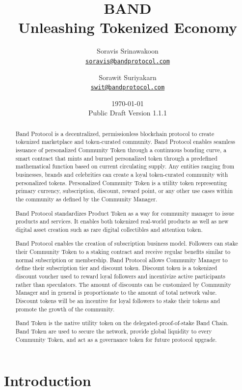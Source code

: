\documentclass[letterpaper,11pt]{article}
\title{\LARGE BAND\\
    \Large Unleashing Tokenized Economy}
\author{
        Soravis Srinawakoon\\
        \small\href{mailto:soravis@bandprotocol.com}
            {\nolinkurl{soravis@bandprotocol.com}}
    \and
        Sorawit Suriyakarn\\
        \small\href{mailto:swit@bandprotocol.com}
            {\nolinkurl{swit@bandprotocol.com}}
    }
\date{\today\\\small Public Draft Version 1.1.1}
\begin{document}
\maketitle

\begin{abstract}

Band Protocol is a decentralized, permissionless blockchain protocol to create tokenized marketplace and token-curated community. Band Protocol enables seamless issuance of personalized Community Token through a continuous bonding curve, a smart contract that mints and burned personalized token through a predefined mathematical function based on current circulating supply. Any entities ranging from businesses, brands and celebrities can create a loyal token-curated community with personalized tokens. Personalized Community Token is a utility token representing primary currency, subscription, discount, reward point, or any other use cases within the community as defined by the Community Manager.

Band Protocol standardizes Product Token as a way for community manager to issue products and services. It enables both tokenized real-world products as well as new digital asset creation such as rare digital collectibles and attention token.

Band Protocol enables the creation of subscription business model. Followers can stake their Community Token to a staking contract and receive regular benefits similar to normal subscription or membership. Band Protocol allows Community Manager to define their subscription tier and discount token. Discount token is a tokenized discount voucher used to reward loyal followers and incentivize active participants rather than speculators. The amount of discounts can be customized by Community Manager and in general is proportionate to the amount of total network value. Discount tokens will be an incentive for loyal followers to stake their tokens and promote the growth of the community.

Band Token is the native utility token on the delegated-proof-of-stake Band Chain. Band Token are used to secure the network, provide global liquidity to every Community Token, and act as a governance token for future protocol upgrade.

\end{abstract}

\newpage
{
\hypersetup{linkcolor=black}
\tableofcontents
}
\newpage

\section{Introduction}
\end{document}
